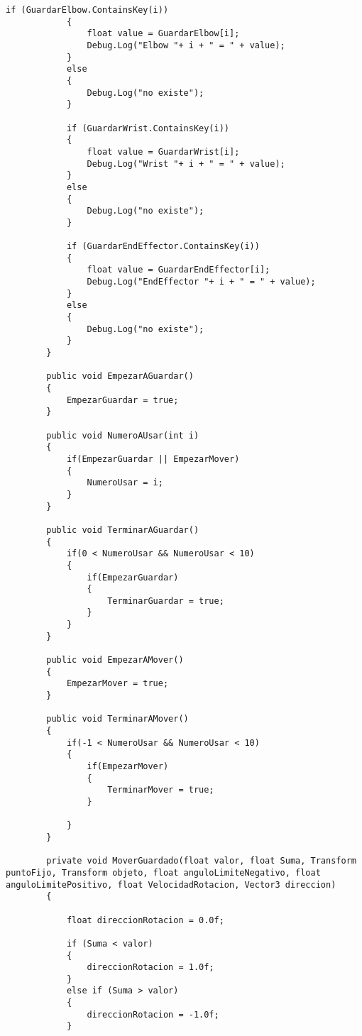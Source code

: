 \begin{lstlisting}[frame=single]
            if (GuardarElbow.ContainsKey(i))
            {
                float value = GuardarElbow[i];
                Debug.Log("Elbow "+ i + " = " + value);
            }
            else
            {
                Debug.Log("no existe");
            }

            if (GuardarWrist.ContainsKey(i))
            {
                float value = GuardarWrist[i];
                Debug.Log("Wrist "+ i + " = " + value);
            }
            else
            {
                Debug.Log("no existe");
            }

            if (GuardarEndEffector.ContainsKey(i))
            {
                float value = GuardarEndEffector[i];
                Debug.Log("EndEffector "+ i + " = " + value);
            }
            else
            {
                Debug.Log("no existe");
            }
        }

        public void EmpezarAGuardar()
        {
            EmpezarGuardar = true;
        }

        public void NumeroAUsar(int i)
        {
            if(EmpezarGuardar || EmpezarMover)
            {
                NumeroUsar = i;
            }
        }

        public void TerminarAGuardar()
        {
            if(0 < NumeroUsar && NumeroUsar < 10)
            {
                if(EmpezarGuardar)
                {
                    TerminarGuardar = true;
                }
            }
        }

        public void EmpezarAMover()
        {
            EmpezarMover = true;
        }

        public void TerminarAMover()
        {
            if(-1 < NumeroUsar && NumeroUsar < 10)
            {
                if(EmpezarMover)
                {
                    TerminarMover = true;
                }
                
            }
        }

        private void MoverGuardado(float valor, float Suma, Transform puntoFijo, Transform objeto, float anguloLimiteNegativo, float anguloLimitePositivo, float VelocidadRotacion, Vector3 direccion)
        {
            
            float direccionRotacion = 0.0f;

            if (Suma < valor)
            {
                direccionRotacion = 1.0f;
            }
            else if (Suma > valor)
            {
                direccionRotacion = -1.0f;
            }


\end{lstlisting}
